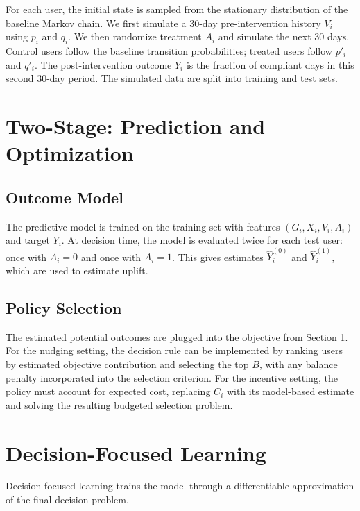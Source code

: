 \documentclass[12pt]{article}
\begin{document}
For each user, the initial state is sampled from the stationary distribution of the baseline Markov chain. We first simulate a 30-day pre-intervention history $V_i$ using $p_i$ and $q_i$. We then randomize treatment $A_i$ and simulate the next 30 days. Control users follow the baseline transition probabilities; treated users follow $p'_i$ and $q'_i$. The post-intervention outcome $Y_i$ is the fraction of compliant days in this second 30-day period. The simulated data are split into training and test sets.

\section{Two-Stage: Prediction and Optimization}
\subsection{Outcome Model}
The predictive model is trained on the training set with features $(G_i, X_i, V_i, A_i)$ and target $Y_i$. At decision time, the model is evaluated twice for each test user: once with $A_i = 0$ and once with $A_i = 1$. This gives estimates $\hat{Y}_i^{(0)}$ and $\hat{Y}_i^{(1)}$, which are used to estimate uplift.

\subsection{Policy Selection}
The estimated potential outcomes are plugged into the objective from Section 1. For the nudging setting, the decision rule can be implemented by ranking users by estimated objective contribution and selecting the top $B$, with any balance penalty incorporated into the selection criterion. For the incentive setting, the policy must account for expected cost, replacing $C_i$ with its model-based estimate and solving the resulting budgeted selection problem.

\section{Decision-Focused Learning}
Decision-focused learning trains the model through a differentiable approximation of the final decision problem. 
\end{document}

